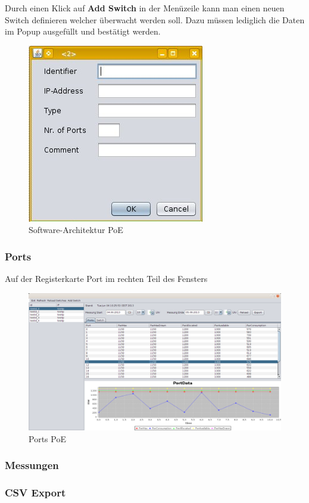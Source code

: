 Durch einen Klick auf \textbf{Add Switch} in der Menüzeile kann man einen neuen
Switch definieren welcher überwacht werden soll. Dazu müssen lediglich die Daten
im Popup ausgefüllt und bestätigt werden.

 \begin{figure}[h]
    \centering
    \leavevmode
    \includegraphics[scale=0.5]{figures/screenshot3.jpg}
    \caption{Software-Architektur PoE}
    \label{fig:NeuerSwitch-PoE}
\end{figure}

\subsubsection{Ports}

Auf der Registerkarte Port im rechten Teil des Fensters

\begin{figure}[h]
    \centering
    \leavevmode
    \includegraphics[width=1.0\linewidth]{figures/screenshot1.png}
    \caption{Ports PoE}
    \label{fig:Ports-PoE}
\end{figure}

\subsubsection{Messungen}

\subsubsection{CSV Export}
